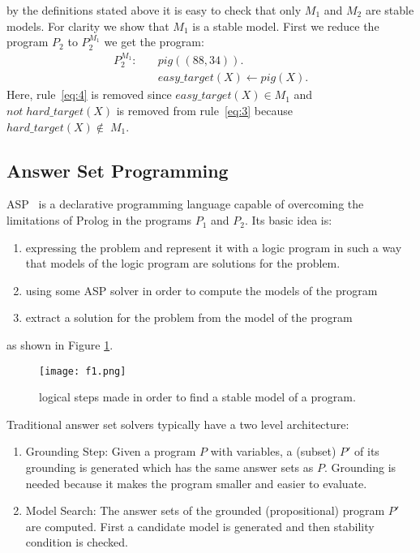 by the definitions stated above it is easy to check that only \(M_1\) and \(M_2\) are stable models. For clarity we show that \(M_1\) is a stable model. First we reduce the program \(P_2\) to \(P_2^{M_1}\) we get the program:
\begin{align}
P_2^{M_1} \colon \quad
&pig((88,34)). \\
&\mathit{easy\_target}(X) \leftarrow pig(X). 
\end{align}
Here, rule~\eqref{eq:4} is removed since \(\mathit{easy\_target}(X) \in M_1\) and \(not\; \mathit{hard\_target}(X)\) is removed from rule~\eqref{eq:3} because \(\mathit{hard\_target}(X) \notin\; M_1\).
\subsection{Answer Set Programming}

ASP~\cite{aspPrime} is a declarative programming language capable of overcoming the limitations of Prolog in the programs \(P_1\) and \(P_2\). Its basic idea is:
\begin{enumerate}
\item expressing the problem and represent it with a logic program in such a way that models of the logic program are solutions for the problem.
\item using some ASP solver in order to compute the models of the program
\item extract a solution for the problem from the model of the program
\end{enumerate}
as shown in Figure \ref{fig:ASP1}.
\begin{figure}
  \texttt{[image: f1.png]}
  \caption{logical steps made in order to find a stable model of a program.}
  \label{fig:ASP1}
\end{figure}
 
Traditional answer set solvers typically have a two level architecture:
\begin{enumerate}
\item Grounding Step: Given a program \(P\) with variables, a (subset) \(P'\) of its grounding is generated which has the same answer sets as \(P\). Grounding is needed because it makes the program smaller and easier to evaluate.
\item Model Search: The answer sets of the grounded (propositional) program \(P'\) are computed. First a candidate model is generated and then stability condition is checked.
\end{enumerate}

